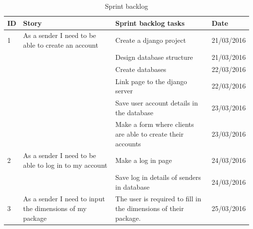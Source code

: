 \documentclass[paper=a4, fontsize=11pt]{scrartcl} %
\numberwithin{equation}{section} %
\numberwithin{figure}{section} %
\numberwithin{table}{section} %
\begin{document}
\begin{table}[!hbt]
\centering
\caption{Sprint backlog}

\begin{tabular}{|p{1cm}|p{5cm}|p{5cm}|p{2cm}|}
\hline
\textbf{ID} & \textbf{Story}                                                                  & \textbf{Sprint backlog tasks}                                                                      & \textbf{Date} \\ \hline
1           & As a sender I need to be able to create an account                              & Create a django project                                                                            & 21/03/2016    \\ \hline
            &                                                                                 & Design database structure                                                                          & 21/03/2016    \\ \hline
            &                                                                                 & Create databases                                                                                   & 22/03/2016    \\ \hline
            &                                                                                 & Link page to the django server                                                                     & 22/03/2016    \\ \hline
            &                                                                                 & Save user account details in the database                                                          & 23/03/2016    \\ \hline
            &                                                                                 & Make a form where clients are able to create their accounts                                        & 23/03/2016    \\ \hline
2           & As a sender I need to be able to log in to my account                           & Make a log in page                                                                                 & 24/03/2016    \\ \hline
            &                                                                                 & Save log in details of senders in database                                                         & 24/03/2016    \\ \hline
3           & As a sender I need to input the dimensions of my package                        & The user is required to fill in the dimensions of their package. & 25/03/2016    \\ \hline

\end{tabular}
\end{table}
\end{document}
